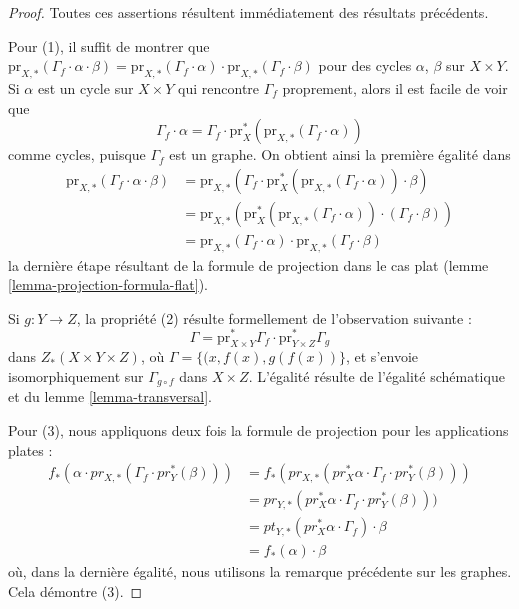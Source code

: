 \begin{proof}
Toutes ces assertions résultent immédiatement des résultats précédents.

\medskip\noindent
Pour (1), il suffit de montrer que
$\text{pr}_{X,*}( \Gamma_f \cdot \alpha \cdot \beta) =
\text{pr}_{X,*}(\Gamma_f \cdot \alpha) \cdot
\text{pr}_{X,*}(\Gamma_f \cdot \beta)$
pour des cycles $\alpha$, $\beta$ sur $X \times Y$. Si $\alpha$ est un cycle sur
$X \times Y$ qui rencontre $\Gamma_f$ proprement, alors il est facile
de voir que
$$
\Gamma_f \cdot \alpha =
\Gamma_f \cdot \text{pr}_X^*(\text{pr}_{X,*}(\Gamma_f \cdot \alpha))
$$
comme cycles, puisque $\Gamma_f$ est un graphe. On obtient ainsi la première
égalité dans
\begin{align*}
\text{pr}_{X,*}(\Gamma_f \cdot \alpha \cdot \beta)
& =
\text{pr}_{X,*}(
\Gamma_f \cdot
\text{pr}_X^*(\text{pr}_{X,*}(\Gamma_f \cdot \alpha)) \cdot \beta) \\
& =
\text{pr}_{X,*}(\text{pr}_X^*(\text{pr}_{X,*}(\Gamma_f \cdot \alpha))
\cdot (\Gamma_f \cdot \beta)) \\
& =
\text{pr}_{X,*}(\Gamma_f \cdot \alpha) \cdot
\text{pr}_{X,*}(\Gamma_f \cdot \beta)
\end{align*}
la dernière étape résultant de la formule de projection dans le cas plat
(lemme \ref{lemma-projection-formula-flat}).

\medskip\noindent
Si $g : Y \to Z$, la propriété (2) résulte formellement de l'observation suivante :
$$
\Gamma =
\text{pr}_{X \times Y}^*\Gamma_f \cdot
\text{pr}_{Y \times Z}^*\Gamma_g
$$
dans $Z_*(X \times Y \times Z)$, où $\Gamma = \{(x, f(x), g(f(x))\}$,
et s'envoie isomorphiquement sur $\Gamma_{g \circ f}$ dans $X \times Z$.
L'égalité résulte de l'égalité schématique et du
lemme \ref{lemma-transversal}.

\medskip\noindent
Pour (3), nous appliquons deux fois la formule de projection pour les applications plates :
\begin{align*}
f_*(\alpha \cdot pr_{X, *}(\Gamma_f \cdot pr_Y^*(\beta)))
& =
f_*(pr_{X, *}(pr_X^*\alpha \cdot \Gamma_f \cdot pr_Y^*(\beta))) \\
& =
pr_{Y, *}(pr_X^*\alpha \cdot \Gamma_f \cdot pr_Y^*(\beta))) \\
& =
pt_{Y, *}(pr_X^*\alpha \cdot \Gamma_f) \cdot \beta \\
& =
f_*(\alpha) \cdot \beta
\end{align*}
où, dans la dernière égalité, nous utilisons la remarque précédente sur les graphes.
Cela démontre (3).


\end{proof}
